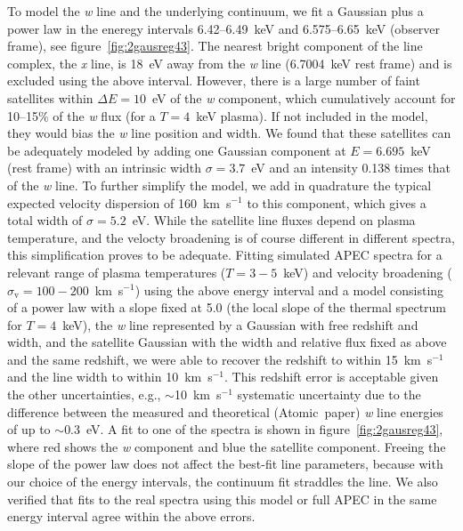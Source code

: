 To model the {\it w} line and the underlying continuum, we fit a Gaussian plus a power law in the eneregy intervals 6.42--6.49~keV and 6.575--6.65~keV (observer frame), see figure~\ref{fig:2gausreg43}. The nearest bright component of the line complex, the {\it x} line, is 18~eV away from the {\it w} line (6.7004~keV rest frame) and is excluded using the above interval. However, there is a large number of faint satellites within $\Delta E=10$~eV of the {\it w} component, which cumulatively account for 10--15\% of the {\it w} flux (for a $T=4$~keV plasma). If not included in the model, they would bias the {\it w} line position and width. We found that these satellites can be adequately modeled by adding one Gaussian component at $E=6.695$~keV (rest frame) with an intrinsic width $\sigma=3.7$~eV and an intensity 0.138 times that of the {\it w} line. To further simplify the model, we add in quadrature the typical expected velocity dispersion of 160~km~s$^{-1}$ to this component, which gives a total width of $\sigma=5.2$~eV. While the satellite line fluxes depend on plasma temperature, and the velocty broadening is of course different in different spectra, this simplification proves to be adequate. Fitting simulated APEC spectra for a relevant range of plasma temperatures ($T=3-5$~keV) and velocity broadening ($\sigma_\mathrm{v}=100-200$~km~s$^{-1}$) using the above energy interval and a model consisting of a power law with a slope fixed at 5.0 (the local slope of the thermal spectrum for $T=4$~keV), the {\it w} line represented by a Gaussian with free redshift and width, and the satellite Gaussian with the width and relative flux fixed as above and the same redshift, we were able to recover the redshift to within 15~km~s$^{-1}$ and the line width to within 10~km~s$^{-1}$. This redshift error is acceptable given the other uncertainties, e.g., $\sim$10~km~s$^{-1}$ systematic uncertainty due to the difference between the measured \citep[e.g.][]{beiersdorfer93} and theoretical (Atomic~paper) {\it w} line energies of up to $\sim$0.3~eV. A fit to one of the spectra is shown in figure~\ref{fig:2gausreg43}, where red shows the {\it w} component and blue the satellite component. Freeing the slope of the power law does not affect the best-fit line parameters, because with our choice of the energy intervals, the continuum fit straddles the line. We also verified that fits to the real spectra using this model or full APEC in the same energy interval agree within the above errors.

